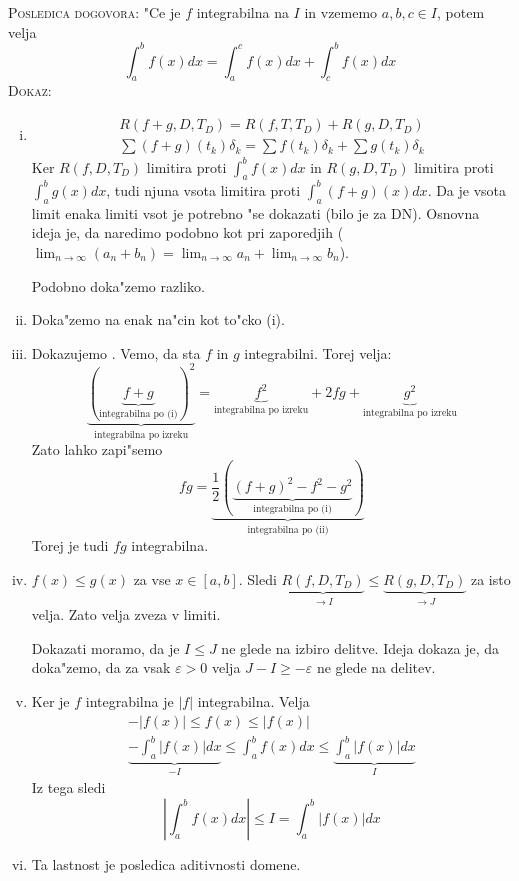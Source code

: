 \textsc{Posledica dogovora:} "Ce je $f$ integrabilna na $I$ in vzememo $a, b, c \in I$, potem velja
\begin{equation*}
\int_{a}^{b} f(x) dx = \int_{a}^{c} f(x) dx + \int_{c}^{b} f(x) dx
\end{equation*}
%
\textsc{Dokaz:}
\begin{enumerate}[(i)]
	\item 
	\begin{gather*}
	R(f+g, D, T_D) = R(f, T, T_D) + R(g, D, T_D) \\
	\sum(f+g) (t_k) \delta_k = \sum f(t_k) \delta_k + \sum g(t_k) \delta_k
	\end{gather*}
	Ker $R(f, D, T_D)$ limitira proti $\int_{a}^{b} f(x) dx$ in $R(g, D, T_D)$ limitira proti $\int_{a}^{b} g(x) dx$, tudi njuna vsota limitira proti $\int_{a}^{b} (f+g) (x) dx$. Da je vsota limit enaka limiti vsot je potrebno "se dokazati (bilo je za DN). Osnovna ideja je, da naredimo podobno kot pri zaporedjih ($\lim_{n \to \infty} (a_n + b_n) = \lim_{n\to \infty} a_n + \lim_{n \to \infty} b_n$).
	
	Podobno doka"zemo razliko.
	
	\item Doka"zemo na enak na"cin kot to"cko (i).
	
	\item Dokazujemo . Vemo, da sta $f$ in $g$ integrabilni. Torej velja:
	\begin{equation*}
	\underbrace{(\underbrace{f + g}_{\text{integrabilna po (i)}})^2}_{\text{integrabilna po izreku}} = \underbrace{f^2}_{\text{integrabilna po izreku}} + 2fg + \underbrace{g^2}_{\text{integrabilna po izreku}}
	\end{equation*}
	Zato lahko zapi"semo
	\begin{equation*}
	fg = \underbrace{\frac{1}{2} ( \underbrace{(f+g)^2 - f^2 - g^2}_\text{integrabilna po (i)})}_{\text{integrabilna po (ii)}}
	\end{equation*}
	Torej je tudi $fg$ integrabilna.
	
	\item $f(x) \leq g(x)$ za vse $x \in [a, b]$. Sledi $\underbrace{R(f, D, T_D)}_{\to I} \leq \underbrace{R(g, D, T_D)}_{\to J}$ za isto velja. Zato velja zveza v limiti.
	
	Dokazati moramo, da je $I \leq J$ ne glede na izbiro delitve. Ideja dokaza je, da doka"zemo, da za vsak $\varepsilon > 0$ velja $J - I \geq - \varepsilon$ ne glede na delitev.
	
	\item Ker je $f$ integrabilna je $|f|$ integrabilna. Velja
	\begin{gather*}
	-|f(x)| \leq f(x) \leq |f(x)| \\
	\underbrace{- \int_{a}^{b} |f(x)| dx}_{-I} \leq \int_{a}^{b} f(x) dx \leq \underbrace{\int_{a}^{b} |f(x)| dx}_I
	\end{gather*}
	Iz tega sledi
	\begin{equation*}
	\left| \int_{a}^{b} f(x) dx \right| \leq I = \int_{a}^{b} |f(x)| dx
	\end{equation*}
	
	\item Ta lastnost je posledica aditivnosti domene.
\end{enumerate}
%
